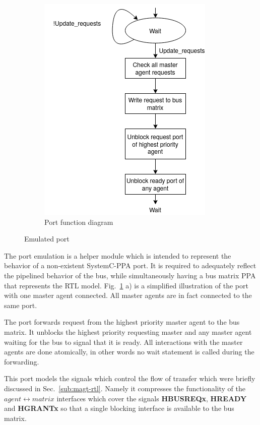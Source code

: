 \begin{figure}[hbt]
\begin{subfigure}[b]{0.3\linewidth}
 \includegraphics[width=\linewidth]{figs/ESL/port_fsm.png}
 \caption{Port function diagram}
 \end{subfigure}
\caption{Emulated port}
\label{fig:em-port}
\end{figure}


The port emulation is a helper module which is intended to represent the behavior of a non-existent SystemC-PPA port. It is required to adequately reflect the pipelined behavior of the bus, while simultaneously having a bus matrix PPA that represents the RTL model. Fig.~\ref{fig:em-port} a) is a simplified illustration of the port with one master agent connected. All master agents are in fact connected to the same port. \par
The port forwards request from the highest priority master agent to the bus matrix. It unblocks the highest priority requesting master and any master agent waiting for the bus to signal that it is ready. All interactions with the master agents are done atomically, in other words no wait statement is called during the forwarding. \par
This port models the signals which control the flow of transfer which were briefly discussed in Sec.~\ref{sub:magt-rtl}. Namely it compresses the functionality of the $agent\leftrightarrow matrix$ interfaces which cover the signals \textbf{HBUSREQx}, \textbf{HREADY} and \textbf{HGRANTx} so that a single blocking interface is available to the bus matrix.






